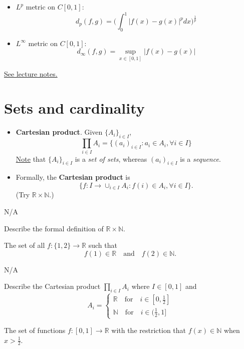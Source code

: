 \begin{itemize}
    \item $L^p$ metric on $C[0, 1]$:
        $$ d_p(f, g) = \biggl( \int_0^1 \lvert f(x) - g(x) \rvert^p dx \biggr)^\frac{1}{p} $$
    \item $L^\infty$ metric on $C[0, 1]$:
        $$ d_\infty(f, g) = \sup_{x \in [0, 1]} \lvert f(x) - g(x) \rvert $$
\end{itemize}

\underline{See lecture notes.} 

\section{Sets and cardinality}

\begin{itemize}
    \item \textbf{Cartesian product}. Given $\{A_i\}_{i \in I}$,
        $$ \prod_{i \in I} A_i = \{ (a_i)_{i \in I}
            : a_i \in A_i, \forall i \in I \} $$
        \underline{Note} that $\{A_i\}_{i \in I}$ is a \textit{set of sets}, whereas $(a_i)_{i \in I}$ is a \textit{sequence}.
    \item Formally, the \textbf{Cartesian product} is
        $$ \{ f : I \to \cup_{i \in I} A_i
            : f(i) \in A_i, \forall i \in I \} . $$
        (Try $\mathbb{R} \times \mathbb{N}$.)
\end{itemize}

\begin{problem}{N/A}{}


    Describe the formal definition of $\mathbb{R} \times \mathbb{N}$.

    \tcblower

    The set of all $f : \{1, 2\} \to \mathbb{R}$ such that
        $$ f(1) \in \mathbb{R} \quad 
            \text{and} \quad f(2) \in \mathbb{N} . $$
\end{problem}

\begin{problem}{N/A}{}


    Describe the Cartesian product $\prod_{i \in I} A_i$ where $I \in [0, 1]$ and
        $$ A_i = 
            \begin{cases}
                \mathbb{R} \quad \text{for} \quad i \in [0, \frac{1}{2}] \\
                \mathbb{N} \quad \text{for} \quad i \in (\frac{1}{2}, 1]
            \end{cases} $$

    \tcblower

    The set of functions $f : [0, 1] \to \mathbb{R}$ with the restriction that $f(x) \in \mathbb{N}$ when $x > \frac{1}{2}$.
\end{problem}

